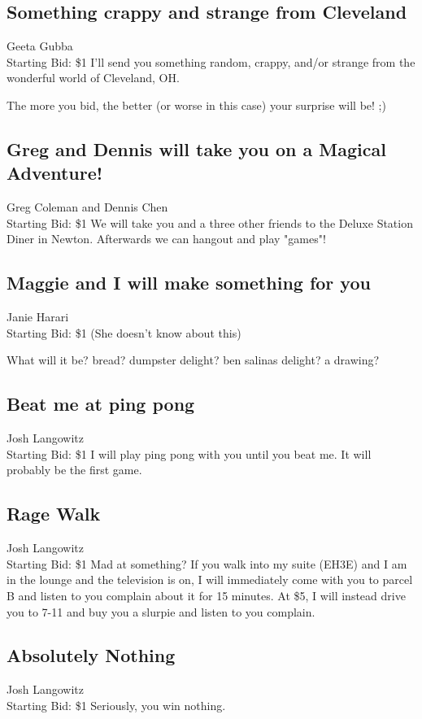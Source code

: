 \documentclass[11pt]{article}
\begin{document}
\subsection{Something crappy and strange from Cleveland}
Geeta Gubba
\\
Starting Bid: \$1
\newline
I'll send you something random, crappy, and/or strange from the wonderful world of Cleveland, OH. 

The more you bid, the better (or worse in this case) your surprise will be! ;)
\subsection{Greg and Dennis will take you on a Magical Adventure!}
Greg Coleman and Dennis Chen
\\
Starting Bid: \$1
\newline
We will take you and a three other friends to the Deluxe Station Diner in Newton. Afterwards we can hangout and play "games"!
\subsection{Maggie and I will make something for you}
Janie Harari
\\
Starting Bid: \$1
\newline
(She doesn't know about this)

What will it be? bread?  dumpster delight? ben salinas delight? a drawing?
\subsection{Beat me at ping pong}
Josh Langowitz
\\
Starting Bid: \$1
\newline
I will play ping pong with you until you beat me. It will probably be the first game.
\subsection{Rage Walk}
Josh Langowitz
\\
Starting Bid: \$1
\newline
Mad at something? If you walk into my suite (EH3E) and I am in the lounge and the television is on, I will immediately come with you to parcel B and listen to you complain about it for 15 minutes. At \$5, I will instead drive you to 7-11 and buy you a slurpie and listen to you complain.
\subsection{Absolutely Nothing}
Josh Langowitz
\\
Starting Bid: \$1
\newline
Seriously, you win nothing.
\end{document}
